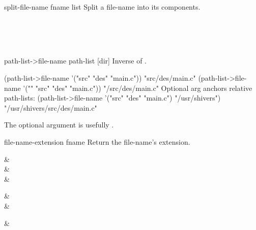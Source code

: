 \begin{defundesc} {split-file-name} {fname} {{\str} list}
    Split a file-name into its components.
%
    \begin{exampletable}
              {}      \\[1.5ex]
              {}   \\[1.5ex]
     {} \\[1.5ex]
     {}
    \end{exampletable}
\end{defundesc}


\begin{defundesc} {path-list->file-name} {path-list [dir]} \str
    Inverse of .
\begin{code}
(path-list->file-name '("src" "des" "main.c")) 
    {\evalto} "src/des/main.c"
(path-list->file-name '("" "src" "des" "main.c"))
    {\evalto} "/src/des/main.c"
\cb
{\rm{}Optional  arg anchors relative path-lists:}
(path-list->file-name '("src" "des" "main.c")
                      "/usr/shivers")
    {\evalto} "/usr/shivers/src/des/main.c"\end{code}
%
    The optional  argument is usefully .
\end{defundesc}


\begin{defundesc} {file-name-extension} {fname} \str
    Return the file-name's extension.
%
    \begin{exampletable}
              &     \\
          &   \\
        & 
    \end{exampletable}
%
    \begin{exampletable}
                &      \\
               & 
    \end{exampletable}
%
    \begin{exampletable}
     & 
    \end{exampletable}
\end{defundesc}


